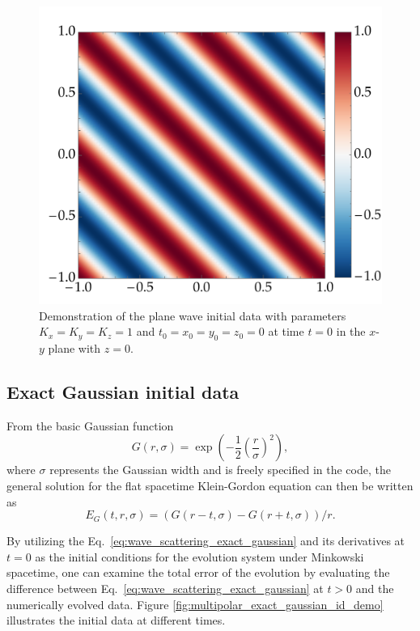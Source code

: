 \begin{figure}[!ht]
  \centering
  \includegraphics[width=0.5\linewidth]{img/wave_scattering/plane_wave_id_examples.png}
  \caption{Demonstration of the plane wave initial data with parameters $K_x = K_y = K_z = 1$ and $t_0 = x_0 = y_0 = z_0 = 0$ at time $t=0$ in the $x$-$y$ plane with $z=0$.}
  \label{fig:multipolar_plane_wave_id_demo}
\end{figure}

\subsection{Exact Gaussian initial data}

From the basic Gaussian function
%
\begin{equation}
  G(r, \sigma) = \exp\left( -\frac{1}{2} \left( \frac{r}{\sigma} \right)^2  \right),
  \label{eq:wave_scattering_gaussian}
\end{equation}
%
where $\sigma$ represents the Gaussian width and is freely specified in the code, the general solution for the flat spacetime Klein-Gordon equation can then be written as
\begin{equation}
  E_G(t, r, \sigma) = \left( G(r-t, \sigma) - G(r+t, \sigma) \right) / r.
  \label{eq:wave_scattering_exact_gaussian}
\end{equation}

By utilizing the Eq.~\eqref{eq:wave_scattering_exact_gaussian} and its derivatives at $t=0$ as the initial conditions for the evolution system under Minkowski spacetime, one can examine the total error of the evolution by evaluating the difference between Eq.~\eqref{eq:wave_scattering_exact_gaussian} at $t>0$ and the numerically evolved data. Figure \ref{fig:multipolar_exact_gaussian_id_demo} illustrates the initial data at different times.

